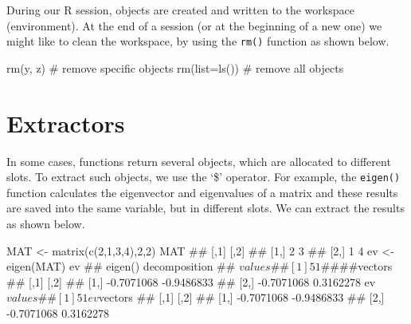 \documentclass[a4paper,12pt,oneside]{book}
\newenvironment{Shaded}{\begin{snugshade}}{\end{snugshade}}
\newcommand{\DecValTok}[1]{#1}
\newcommand{\SpecialCharTok}[1]{#1}
\newcommand{\CommentTok}[1]{#1}
\newcommand{\DocumentationTok}[1]{#1}
\newcommand{\OtherTok}[1]{#1}
\newcommand{\FunctionTok}[1]{#1}
\newcommand{\AttributeTok}[1]{#1}
\newcommand{\NormalTok}[1]{#1}
\begin{document}
During our R session, objects are created and written to the workspace (environment). At the end of a session (or at the beginning of a new one) we might like to clean the workspace, by using the \texttt{rm()} function as shown below.

\begin{Shaded}
\begin{Highlighting}[]
\FunctionTok{rm}\NormalTok{(y, z) }\CommentTok{\# remove specific objects}
\FunctionTok{rm}\NormalTok{(}\AttributeTok{list=}\FunctionTok{ls}\NormalTok{()) }\CommentTok{\# remove all objects}
\end{Highlighting}
\end{Shaded}

\hypertarget{extractors}{%
\section{Extractors}\label{extractors}}

In some cases, functions return several objects, which are allocated to different slots. To extract such objects, we use the `\$' operator. For example, the \texttt{eigen()} function calculates the eigenvector and eigenvalues of a matrix and these results are saved into the same variable, but in different slots. We can extract the results as shown below.

\begin{Shaded}
\begin{Highlighting}[]
\NormalTok{MAT  }\OtherTok{\textless{}{-}}  \FunctionTok{matrix}\NormalTok{(}\FunctionTok{c}\NormalTok{(}\DecValTok{2}\NormalTok{,}\DecValTok{1}\NormalTok{,}\DecValTok{3}\NormalTok{,}\DecValTok{4}\NormalTok{),}\DecValTok{2}\NormalTok{,}\DecValTok{2}\NormalTok{)}
\NormalTok{MAT}
\DocumentationTok{\#\#      [,1] [,2]}
\DocumentationTok{\#\# [1,]    2    3}
\DocumentationTok{\#\# [2,]    1    4}
\NormalTok{ev  }\OtherTok{\textless{}{-}}  \FunctionTok{eigen}\NormalTok{(MAT)}
\NormalTok{ev}
\DocumentationTok{\#\# eigen() decomposition}
\DocumentationTok{\#\# $values}
\DocumentationTok{\#\# [1] 5 1}
\DocumentationTok{\#\# }
\DocumentationTok{\#\# $vectors}
\DocumentationTok{\#\#            [,1]       [,2]}
\DocumentationTok{\#\# [1,] {-}0.7071068 {-}0.9486833}
\DocumentationTok{\#\# [2,] {-}0.7071068  0.3162278}
\NormalTok{ev}\SpecialCharTok{$}\NormalTok{values}
\DocumentationTok{\#\# [1] 5 1}
\NormalTok{ev}\SpecialCharTok{$}\NormalTok{vectors}
\DocumentationTok{\#\#            [,1]       [,2]}
\DocumentationTok{\#\# [1,] {-}0.7071068 {-}0.9486833}
\DocumentationTok{\#\# [2,] {-}0.7071068  0.3162278}
\end{Highlighting}
\end{Shaded}
\end{document}
